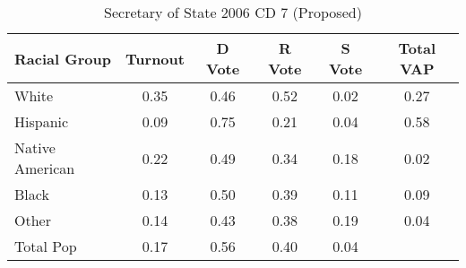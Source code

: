 \begin{table}[htb]
\begin{center}
\caption{Secretary of State 2006 CD 7 (Proposed)}
\label{sos06_vap_cd_7}
\begin{tabular}{lccccc}
  \hline
Racial Group & Turnout & D Vote & R Vote & S Vote & Total VAP \\ 
  \hline
White & 0.35 & 0.46 & 0.52 & 0.02 & 0.27 \\ 
  Hispanic & 0.09 & 0.75 & 0.21 & 0.04 & 0.58 \\ 
  Native American & 0.22 & 0.49 & 0.34 & 0.18 & 0.02 \\ 
  Black & 0.13 & 0.50 & 0.39 & 0.11 & 0.09 \\ 
  Other & 0.14 & 0.43 & 0.38 & 0.19 & 0.04 \\ 
  Total Pop & 0.17 & 0.56 & 0.40 & 0.04 &  \\ 
   \hline
\end{tabular}
\end{center}
\end{table}
